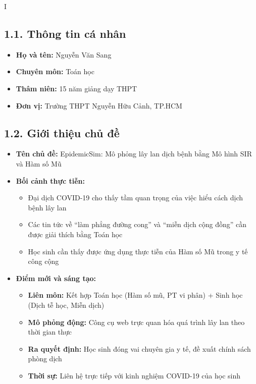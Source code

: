 \documentclass[12pt,a4paper]{article}
\begin{document}
\tableofcontents
\thispagestyle{empty}

\begin{competitionsection}{I}
\vspace{0.5cm}
\subsection*{1.1. Thông tin cá nhân}
\begin{itemize}[leftmargin=*,noitemsep]
\item \textbf{Họ và tên:} Nguyễn Văn Sang
\item \textbf{Chuyên môn:} Toán học
\item \textbf{Thâm niên:} 15 năm giảng dạy THPT
\item \textbf{Đơn vị:} Trường THPT Nguyễn Hữu Cảnh, TP.HCM
\end{itemize}

\subsection*{1.2. Giới thiệu chủ đề}
\begin{itemize}[leftmargin=*,noitemsep]
\item \textbf{Tên chủ đề:} \textcolor{danger}{EpidemicSim: Mô phỏng lây lan dịch bệnh bằng Mô hình SIR và Hàm số Mũ}
\item \textbf{Bối cảnh thực tiễn:}
    \begin{itemize}
    \item Đại dịch COVID-19 cho thấy tầm quan trọng của việc hiểu cách dịch bệnh lây lan
    \item Các tin tức về ``làm phẳng đường cong'' và ``miễn dịch cộng đồng'' cần được giải thích bằng Toán học
    \item Học sinh cần thấy được ứng dụng thực tiễn của Hàm số Mũ trong y tế công cộng
    \end{itemize}
\item \textbf{Điểm mới và sáng tạo:}
    \begin{itemize}
    \item \textbf{Liên môn:} Kết hợp Toán học (Hàm số mũ, PT vi phân) + Sinh học (Dịch tễ học, Miễn dịch)
    \item \textbf{Mô phỏng động:} Công cụ web trực quan hóa quá trình lây lan theo thời gian thực
    \item \textbf{Ra quyết định:} Học sinh đóng vai chuyên gia y tế, đề xuất chính sách phòng dịch
    \item \textbf{Thời sự:} Liên hệ trực tiếp với kinh nghiệm COVID-19 của học sinh
    \end{itemize}
\end{itemize}


\end{competitionsection}
\end{document}
